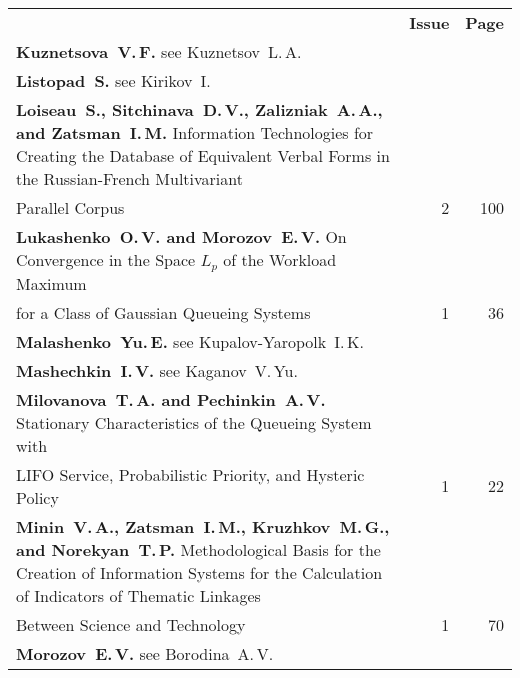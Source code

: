 \def\leftkol{2013 AUTHOR INDEX} %

\def\rightkol{2013 AUTHOR INDEX} %


{\tabcolsep=3pt
\begin{tabular}{p{397pt}rr}
&\textbf{Issue} & \textbf{Page}\\[6pt]
\textbf{Kuznetsova~V.\,F.} see Kuznetsov~L.\,A.&&\\
\textbf{Listopad~S.} see Kirikov~I.&&\\
\hangindent=23pt\noindent\textbf{Loiseau~S., Sitchinava~D.\,V., Zalizniak~A.\,A., and
Zatsman~I.\,M.}
Information Technologies for Creating the Database of Equivalent Verbal Forms in the
Russian-French Multivariant\linebreak
\vspace*{-12pt}\\
\hspace*{23pt}Parallel Corpus\dotfill&2&100\\
\textbf{Lukashenko~O.\,V. and Morozov~E.\,V.}
On Convergence in the Space $L_p$ of the Workload Maximum\linebreak
\vspace*{-12pt}\\
\hspace*{23pt}for a Class of Gaussian Queueing Systems\dotfill&1&36\\
\textbf{Malashenko~Yu.\,E.} see Kupalov-Yaropolk~I.\,K.&&\\
\textbf{Mashechkin~I.\,V.} see Kaganov~V.\,Yu.&&\\
\textbf{Milovanova~T.\,A. and Pechinkin~A.\,V.}
Stationary Characteristics of the Queueing System with\linebreak
\vspace*{-12pt}\\
\hspace*{23pt}LIFO Service, Probabilistic Priority, and Hysteric Policy\dotfill&1&22\\
\hangindent=23pt\noindent\textbf{Minin~V.\,A., Zatsman~I.\,M., Kruzhkov~M.\,G., and
Norekyan~T.\,P.}
Methodological Basis for the Creation of Information Systems for the Calculation of
Indicators of Thematic Linkages\linebreak
\vspace*{-12pt}\\
\hspace*{23pt}Between Science and Technology\dotfill&1&70\\
\textbf{Morozov~E.\,V.} see Borodina~A.\,V.&&\\

\end{tabular}}
